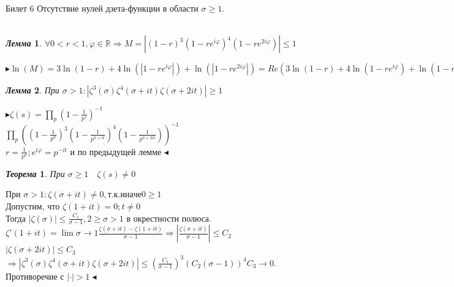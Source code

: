 \documentclass[a4paper,12pt]{article}
\newtheorem{teo}{\textit{Теорема}}
\newtheorem{lem}{\textit{Лемма}}
\newcommand{\q}{\quad}
\newcommand{\pb}{\blacktriangleright}
\newcommand{\pe}{\blacktriangleleft}
\newcommand{\Ra}{\Rightarrow}
\newcommand{\bb}[1]{\mathbb{#1}}
\newcommand{\SL}{\sum\limits}
\newcommand{\os}{\left(}
\newcommand{\cs}{\right)}
\begin{document}
\newpage
\begin{mybox}{\hypertarget{bil6}{Билет 6}}
Отсутствие нулей дзета-функции в области $\sigma \ge 1$.\q\\\q\\
\begin{lem} $\forall 0 < r < 1, \varphi\in \bb{R} \Ra M = \left| (1-r)^3(1-re^{i\varphi})^4 (1 - re^{2i\varphi}) \right| \le 1 $
\end{lem}
$\pb \ln(M) = 3\ln(1-r) + 4\ln(|1-re^{i\varphi}|) + \ln(|1 - re^{2i\varphi}|) = Re(3\ln(1-r) + 4\ln(1-re^{i\varphi}) + \ln(1 - re^{2i\varphi})) = -\SL_{n=1}^\infty \frac{r^n}{n}Re(3+4e^{in\varphi} + e^{2in\varphi}) = \SL_{n=1}^\infty \frac{r^n}{n} (3 + 4\cos(n\varphi) + \cos(2n\varphi)) = -2\SL_{n=1}^\infty \frac{r^n}{n} (\cos(n\varphi) + 1)^2 \pe  $\\
\begin{lem} При $\sigma > 1: |\zeta^3(\sigma)\zeta^4(\sigma+it)\zeta(\sigma+2it)| \ge 1$
\end{lem}
$\pb\zeta(s) = \prod\limits_p \os 1 - \frac{1}{p^s} \cs ^{-1}$\\
$\prod\limits_p \os \os 1 - \frac{1}{p^\sigma} \cs^3 \os 1 - \frac{1}{p^{\sigma+it}} \cs^4 \os 1 - \frac{1}{p^{\sigma+2it}} \cs \cs^{-1}$\\
$r = \frac{1}{p^\sigma}; e^{i\varphi} = p^{-it}$ и по предыдущей лемме $\pe$



\begin{teo} При $\sigma \ge 1 \q \zeta(s) \not= 0$
\end{teo}
При $\sigma > 1: \zeta(\sigma+it)\not=0, т.к. иначе 0\ge1$\\
Допустим, что $\zeta(1+it) = 0; t\not=0$\\
Тогда $|\zeta(\sigma)| \le \frac{C_1}{\sigma-1}, 2 \ge \sigma > 1 $ в окрестности полюса.\\
$\zeta'(1+it) = \lim\limits{\sigma\to1}\frac{\zeta(\sigma+it) - \zeta(1+it)}{\sigma-1}\Ra \left|\frac{\zeta(\sigma+it)}{\sigma-1}\right| \le C_2$\\
$|\zeta(\sigma+2it)| \le C_3$\\
$\Ra |\zeta^3(\sigma) \zeta^4(\sigma+it)\zeta(\sigma+2it)| \le \os \frac{C_1}{\sigma-1} \cs^3 (C_2(\sigma-1))^4 C_3 \to 0$. Противоречие с $|\cdot| > 1\pe$
\end{mybox}
\end{document}
